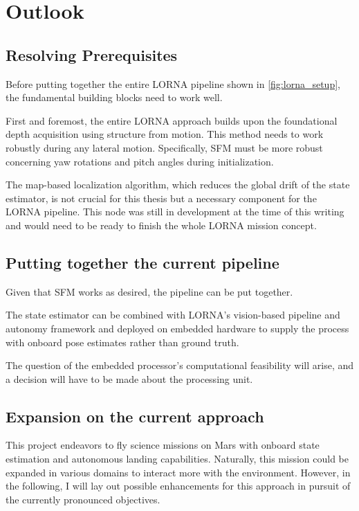 \chapter{Outlook}
\label{sec:outlook}

\section{Resolving Prerequisites}

Before putting together the entire LORNA pipeline shown in \cref{fig:lorna_setup}, the fundamental building blocks need to work well. 

First and foremost, the entire LORNA approach builds upon the foundational depth acquisition using structure from motion. This method needs to work robustly during any lateral motion. Specifically, SFM must be more robust concerning yaw rotations and pitch angles during initialization.

The map-based localization algorithm, which reduces the global drift of the state estimator, is not crucial for this thesis but a necessary component for the LORNA pipeline. This node was still in development at the time of this writing and would need to be ready to finish the whole LORNA mission concept.

\section{Putting together the current pipeline}

Given that SFM works as desired, the pipeline can be put together. 

The state estimator can be combined with LORNA's vision-based pipeline and autonomy framework and deployed on embedded hardware to supply the process with onboard pose estimates rather than ground truth. 

The question of the embedded processor's computational feasibility will arise, and a decision will have to be made about the processing unit.

\section{Expansion on the current approach}

This project endeavors to fly science missions on Mars with onboard state estimation and autonomous landing capabilities. Naturally, this mission could be expanded in various domains to interact more with the environment. However, in the following, I will lay out possible enhancements for this approach in pursuit of the currently pronounced objectives.

